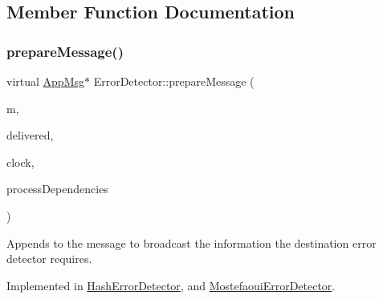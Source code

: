 \subsection{Member Function Documentation}
\mbox{\label{class_error_detector_a8cac1f6ac6803da4379df7891789c490}} 
\subsubsection{\texorpdfstring{prepare\+Message()}{prepareMessage()}}
{\footnotesize\ttfamily virtual \hyperlink{class_app_msg}{App\+Msg}$\ast$ Error\+Detector\+::prepare\+Message (\begin{DoxyParamCaption}\item[{\hyperlink{class_app_msg}{App\+Msg} $\ast$}]{m,  }\item[{const vector$<$ \hyperlink{structures_8h_a7e7bdc1d2fff8a9436f2f352b2711ed6}{message\+Info} $>$ \&}]{delivered,  }\item[{const \hyperlink{class_probabilistic_clock}{Probabilistic\+Clock} \&}]{clock,  }\item[{const \hyperlink{class_total_dependencies}{Total\+Dependencies} \&}]{process\+Dependencies }\end{DoxyParamCaption})\hspace{0.3cm}{\ttfamily [pure virtual]}}



Appends to the message to broadcast the information the destination error detector requires. 



Implemented in \hyperlink{class_hash_error_detector_a2b1dad6a83a08fd7ce88e32f84638459}{Hash\+Error\+Detector}, and \hyperlink{class_mostefaoui_error_detector_adcd530d7349df19adb614ca414225214}{Mostefaoui\+Error\+Detector}.

\mbox{\label{class_error_detector_afc717d04768dd207196c08e24163115c}} 
